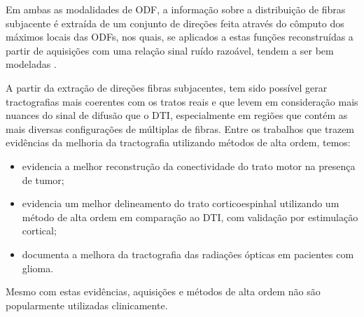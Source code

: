 \documentclass[
    12pt,                %
    oneside,            %
    a4paper,            %
    english,            %
    french,                %
    spanish,            %
    brazil                %
    ]{abntex2}
\begin{document}
Em ambas as modalidades de ODF, a informação sobre a distribuição de fibras subjacente é extraída de um conjunto de direções feita através do cômputo dos máximos locais das ODFs, nos quais, se aplicados a estas funções reconstruídas a partir de aquisições com uma relação sinal ruído razoável, tendem a ser bem modeladas \cite{fillard2011}.


A partir da extração de direções fibras subjacentes, tem sido possível gerar tractografias mais coerentes com os tratos reais e que levem em consideração mais nuances do sinal de difusão que o DTI, especialmente em regiões que contém as mais diversas configurações de múltiplas de fibras. Entre os trabalhos que trazem evidências da melhoria da tractografia utilizando métodos de alta ordem, temos:

\begin{itemize}
    \item {} evidencia a melhor reconstrução da conectividade do trato motor na presença de tumor;
    \item {} evidencia um melhor delineamento do trato corticoespinhal utilizando um método de alta ordem em comparação ao DTI, com validação por estimulação cortical;
    \item {} documenta a melhora da tractografia das radiações ópticas em pacientes com glioma.
\end{itemize}
Mesmo com estas evidências, aquisições e métodos de alta ordem não são popularmente utilizadas clinicamente.


\end{document}
